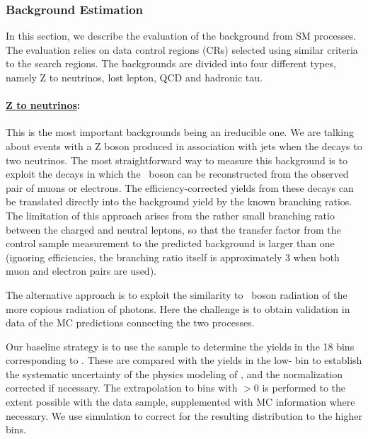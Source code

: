 \subsubsection{Background Estimation }
In this section, we describe the evaluation of the background from SM processes. The evaluation
relies on data control regions (CRs) selected using similar criteria to the search regions. The backgrounds are 
divided into four different types, namely Z to neutrinos, lost lepton, QCD and hadronic tau.

\paragraph{\underline {Z to neutrinos}: }


This is the most important backgrounds being an ireducible one. We are talking about events with a Z boson produced in association with jets when the \cPZ decays to two neutrinos. The most straightforward way to measure this background is
to exploit the decays \zll in which the \cPZ\ boson can be
reconstructed from the observed pair of muons or electrons.  The
efficiency-corrected yields from these decays can be translated
directly into the \znn background yield by the known branching
ratios.  The limitation of this approach arises from the rather small
branching ratio between the charged and neutral leptons, so that the
transfer factor from the control sample measurement to the predicted
background is larger than one (ignoring efficiencies, the
branching ratio itself is approximately 3 when both muon and electron
pairs are used). 

The alternative approach is to exploit the similarity to \cPZ\ boson
radiation of the more copious radiation of photons.  Here the
challenge is to obtain validation in data of the MC predictions
connecting the two processes.

Our baseline strategy is to use the \gjets sample to determine the
yields in the 18 bins corresponding to .  These are
compared with the \zll yields in the low-\njets
bin to establish the systematic uncertainty of the physics modeling of
\gjets, and the normalization corrected if necessary.  
The extrapolation to bins with \nbjets$>$0 is performed to
the extent possible with the \zll data sample, supplemented with MC
information where necessary. We use simulation to correct for the
resulting distribution to the higher \njets bins.

